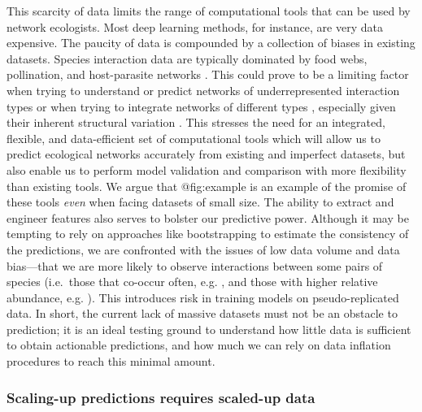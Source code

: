 This scarcity of data limits the range of computational tools that can
be used by network ecologists. Most deep learning methods, for instance,
are very data expensive. The paucity of data is compounded by a
collection of biases in existing datasets. Species interaction data are
typically dominated by food webs, pollination, and host-parasite
networks \cite{Ings2009EcoNet, @Poisot2020EnvBia}. This could prove to
be a limiting factor when trying to understand or predict networks of
underrepresented interaction types or when trying to integrate networks
of different types \cite{Fontaine2011EcoEvo}, especially given their
inherent structural variation \cite{Michalska-Smith2019TelEco}. This
stresses the need for an integrated, flexible, and data-efficient set of
computational tools which will allow us to predict ecological networks
accurately from existing and imperfect datasets, but also enable us to
perform model validation and comparison with more flexibility than
existing tools. We argue that @fig:example is an example of the promise
of these tools \emph{even} when facing datasets of small size. The
ability to extract and engineer features also serves to bolster our
predictive power. Although it may be tempting to rely on approaches like
bootstrapping to estimate the consistency of the predictions, we are
confronted with the issues of low data volume and data bias---that we
are more likely to observe interactions between some pairs of species
(i.e.~those that co-occur often, e.g. \cite{Cazelles2015TheSpe}, and those
with higher relative abundance, e.g. \cite{Vazquez2009UniPat}). This
introduces risk in training models on pseudo-replicated data. In short,
the current lack of massive datasets must not be an obstacle to
prediction; it is an ideal testing ground to understand how little data
is sufficient to obtain actionable predictions, and how much we can rely
on data inflation procedures to reach this minimal amount.

\subsubsection{Scaling-up predictions requires scaled-up
data}\label{scaling-up-predictions-requires-scaled-up-data}

